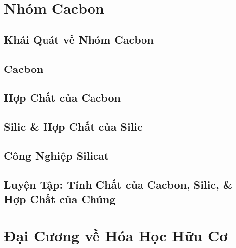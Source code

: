 \documentclass[oneside]{book}
\numberwithin{equation}{section}
\begin{document}

\chapter{Nhóm Cacbon}

\section{Khái Quát về Nhóm Cacbon}


\section{Cacbon}


\section{Hợp Chất của Cacbon}


\section{Silic \& Hợp Chất của Silic}


\section{Công Nghiệp Silicat}


\section{Luyện Tập: Tính Chất của Cacbon, Silic, \& Hợp Chất của Chúng}


\chapter{Đại Cương về Hóa Học Hữu Cơ}
\end{document}
